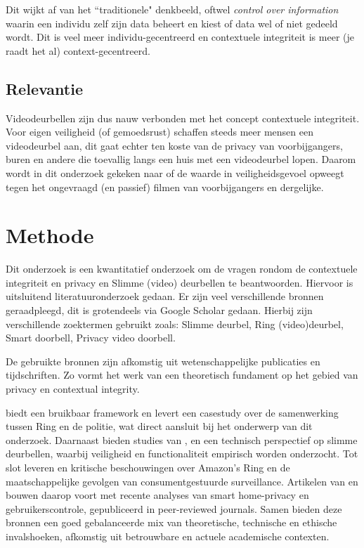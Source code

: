 \documentclass[nonacm, sigconf]{acmart}
\begin{document}
    Dit wijkt af van het ``traditionele" denkbeeld, oftwel \textit{control over information} waarin een individu zelf zijn data beheert en kiest of data wel of niet gedeeld wordt.
    Dit is veel meer individu-gecentreerd en contextuele integriteit is meer (je raadt het al) context-gecentreerd.

    \subsection{Relevantie}
    Videodeurbellen zijn dus nauw verbonden met het concept contextuele integriteit.
    Voor eigen veiligheid (of gemoedsrust) schaffen steeds meer mensen een videodeurbel aan, dit gaat echter ten koste van de privacy van voorbijgangers, buren en andere die toevallig langs een huis met een videodeurbel lopen.
    Daarom wordt in dit onderzoek gekeken naar of de waarde in veiligheidsgevoel opweegt tegen het ongevraagd (en passief) filmen van voorbijgangers en dergelijke.


    \section{Methode}
    Dit onderzoek is een kwantitatief onderzoek om de vragen rondom de contextuele integriteit en privacy en Slimme (video) deurbellen te beantwoorden.
    Hiervoor is uitsluitend literatuuronderzoek gedaan.
    Er zijn veel verschillende bronnen geraadpleegd, dit is grotendeels via Google Scholar gedaan.
    Hierbij zijn verschillende zoektermen gebruikt zoals: Slimme deurbel, Ring (video)deurbel, Smart doorbell, Privacy video doorbell.

    De gebruikte bronnen zijn afkomstig uit wetenschappelijke publicaties en tijdschriften.
    Zo vormt het werk van \citeauthor{nissenbaum2009privacy} een theoretisch fundament op het gebied van privacy en contextual integrity.

    \citeauthor{van2016privacy} biedt een bruikbaar framework en \citeauthor{shaffer2021applying} levert een casestudy over de samenwerking tussen Ring en de politie, wat direct aansluit bij het onderwerp van dit onderzoek.
    Daarnaast bieden studies van \citeauthor{liu2021ethical}, \citeauthor{lalitha2019smart} en \citeauthor{chaudhari2020smart} een technisch perspectief op slimme deurbellen, waarbij veiligheid en functionaliteit empirisch worden onderzocht.
    Tot slot leveren \citeauthor{selinger2022amazon} en \citeauthor{kelly2023ring} kritische beschouwingen over Amazon's Ring en de maatschappelijke gevolgen van consumentgestuurde surveillance.
    Artikelen van \citeauthor{shaffer2021applying} en \citeauthor{tabassum2023exploring} bouwen daarop voort met recente analyses van smart home-privacy en gebruikerscontrole, gepubliceerd in peer-reviewed journals.
    Samen bieden deze bronnen een goed gebalanceerde mix van theoretische, technische en ethische invalshoeken, afkomstig uit betrouwbare en actuele academische contexten.
\end{document}
